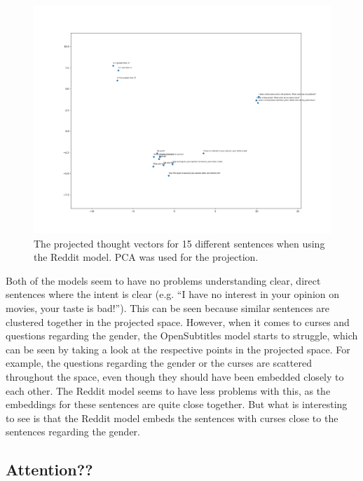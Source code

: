 \begin{figure}[H]
	\centering
	\includegraphics[width=16cm]{img/reddit_thought_vector_embeddings.png}
	\caption{The projected thought vectors for 15 different sentences when using the Reddit model. PCA was used for the projection.}
	\label{results:thougth_vectors:embeddings:reddit}
\end{figure}

Both of the models seem to have no problems understanding clear, direct sentences where the intent is clear (e.g. ``I have no interest in your opinion on movies, your taste is bad!''). This can be seen because similar sentences are clustered together in the projected space. However, when it comes to curses and questions regarding the gender, the OpenSubtitles model starts to struggle, which can be seen by taking a look at the respective points in the projected space. For example, the questions regarding the gender or the curses are scattered throughout the space, even though they should have been embedded closely to each other. The Reddit model seems to have less problems with this, as the embeddings for these sentences are quite close together. But what is interesting to see is that the Reddit model embeds the sentences with curses close to the sentences regarding the gender.

\subsection{Attention??} 

